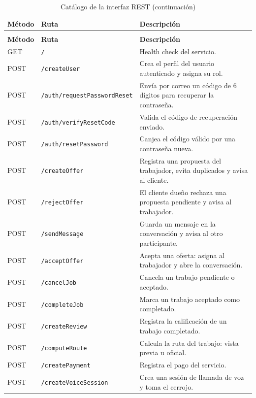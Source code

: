 \documentclass[doc,12pt,a4paper]{apa7}
\begin{document}
\small
\begin{longtable}{|P{3.0cm}|P{6.0cm}|L{5.0cm}|}
\caption{Catálogo de la interfaz REST}\\
\hline
\textbf{Método} & \textbf{Ruta} & \textbf{Descripción} \\ \hline
\endfirsthead
\caption[]{Catálogo de la interfaz REST (continuación)}\\
\hline
\textbf{Método} & \textbf{Ruta} & \textbf{Descripción} \\ \hline
\endhead
\hline
\endfoot

GET & \texttt{/} & Health check del servicio. \\ \hline
POST & \texttt{/createUser} & Crea el perfil del usuario autenticado y asigna su rol. \\ \hline
POST & \texttt{/auth/requestPasswordReset} & Envía por correo un código de 6 dígitos para recuperar la contraseña. \\ \hline
POST & \texttt{/auth/verifyResetCode} & Valida el código de recuperación enviado. \\ \hline
POST & \texttt{/auth/resetPassword} & Canjea el código válido por una contraseña nueva. \\ \hline
POST & \texttt{/createOffer} & Registra una propuesta del trabajador, evita duplicados y avisa al cliente. \\ \hline
POST & \texttt{/rejectOffer} & El cliente dueño rechaza una propuesta pendiente y avisa al trabajador. \\ \hline
POST & \texttt{/sendMessage} & Guarda un mensaje en la conversación y avisa al otro participante. \\ \hline
POST & \texttt{/acceptOffer} & Acepta una oferta: asigna al trabajador y abre la conversación. \\ \hline
POST & \texttt{/cancelJob} & Cancela un trabajo pendiente o aceptado. \\ \hline
POST & \texttt{/completeJob} & Marca un trabajo aceptado como completado. \\ \hline
POST & \texttt{/createReview} & Registra la calificación de un trabajo completado. \\ \hline
POST & \texttt{/computeRoute} & Calcula la ruta del trabajo: vista previa u oficial. \\ \hline
POST & \texttt{/createPayment} & Registra el pago del servicio. \\ \hline
POST & \texttt{/createVoiceSession} & Crea una sesión de llamada de voz y toma el cerrojo. \\ \hline

\end{longtable}
\end{document}
